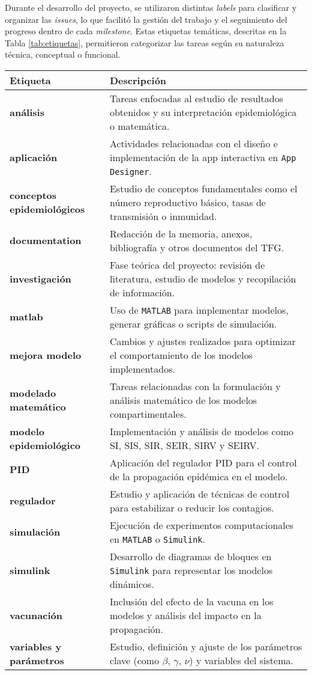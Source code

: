 Durante el desarrollo del proyecto, se utilizaron distintas \textit{labels} para clasificar y organizar las \textit{issues}, lo que facilitó la gestión del trabajo y el seguimiento del progreso dentro de cada \textit{milestone}. Estas etiquetas temáticas, descritas en la Tabla \ref{tab:etiquetas}, permitieron categorizar las tareas según su naturaleza técnica, conceptual o funcional.


\begin{table}[H]
    \centering
    \begin{tabular}{|p{4cm}|p{8cm}|}
    \hline
    \textbf{Etiqueta} & \textbf{Descripción} \\
    \hline
    \textbf{análisis} & Tareas enfocadas al estudio de resultados obtenidos y su interpretación epidemiológica o matemática. \\
    \hline
    \textbf{aplicación} & Actividades relacionadas con el diseño e implementación de la app interactiva en \texttt{App Designer}. \\
    \hline
    \textbf{conceptos epidemiológicos} & Estudio de conceptos fundamentales como el número reproductivo básico, tasas de transmisión o inmunidad. \\
    \hline
    \textbf{documentation} & Redacción de la memoria, anexos, bibliografía y otros documentos del TFG. \\
    \hline
    \textbf{investigación} & Fase teórica del proyecto: revisión de literatura, estudio de modelos y recopilación de información. \\
    \hline
    \textbf{matlab} & Uso de \texttt{MATLAB} para implementar modelos, generar gráficas o scripts de simulación. \\
    \hline
    \textbf{mejora modelo} & Cambios y ajustes realizados para optimizar el comportamiento de los modelos implementados. \\
    \hline
    \textbf{modelado matemático} & Tareas relacionadas con la formulación y análisis matemático de los modelos compartimentales. \\
    \hline
    \textbf{modelo epidemiológico} & Implementación y análisis de modelos como SI, SIS, SIR, SEIR, SIRV y SEIRV. \\
    \hline
    \textbf{PID} & Aplicación del regulador PID para el control de la propagación epidémica en el modelo. \\
    \hline
    \textbf{regulador} & Estudio y aplicación de técnicas de control para estabilizar o reducir los contagios. \\
    \hline
    \textbf{simulación} & Ejecución de experimentos computacionales en \texttt{MATLAB} o \texttt{Simulink}. \\
    \hline
    \textbf{simulink} & Desarrollo de diagramas de bloques en \texttt{Simulink} para representar los modelos dinámicos. \\
    \hline
    \textbf{vacunación} & Inclusión del efecto de la vacuna en los modelos y análisis del impacto en la propagación. \\
    \hline
    \textbf{variables y parámetros} & Estudio, definición y ajuste de los parámetros clave (como $\beta$, $\gamma$, $\nu$) y variables del sistema. \\
    \hline
    

\end{tabular}
\end{table}
